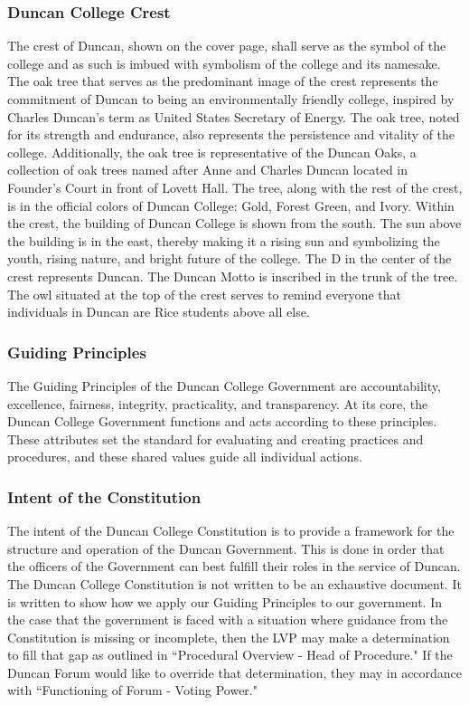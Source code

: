 \documentclass[USletter,12pt]{article}
\begin{document}
\subsubsection{Duncan College Crest}
The crest of Duncan, shown on the cover page, shall serve as the symbol of the college and as such is imbued with symbolism of the college and its namesake.  The oak tree that serves as the predominant image of the crest represents the commitment of Duncan to being an environmentally friendly college, inspired by Charles Duncan's term as United States Secretary of Energy.  The oak tree, noted for its strength and endurance, also represents the persistence and vitality of the college.  Additionally, the oak tree is representative of the Duncan Oaks, a collection of oak trees named after Anne and Charles Duncan located in Founder's Court in front of Lovett Hall.  The tree, along with the rest of the crest, is in the official colors of Duncan College: Gold, Forest Green, and Ivory.  Within the crest, the building of Duncan College is shown from the south.  The sun above the building is in the east, thereby making it a rising sun and symbolizing the youth, rising nature, and bright future of the college.  The D in the center of the crest represents Duncan.  The Duncan Motto is inscribed in the trunk of the tree.  The owl situated at the top of the crest serves to remind everyone that individuals in Duncan are Rice students above all else.

\subsubsection{Guiding Principles}
The Guiding Principles of the Duncan College Government are accountability, excellence, fairness, integrity, practicality, and transparency. At its core, the Duncan College Government functions and acts according to these principles. These attributes set the standard for evaluating and creating practices and procedures, and these shared values guide all individual actions.

\subsubsection{Intent of the Constitution}
The intent of the Duncan College Constitution is to provide a framework for the structure and operation of the Duncan Government.  This is done in order that the officers of the Government can best fulfill their roles in the service of Duncan. 
The Duncan College Constitution is not written to be an exhaustive document.  It is written to show how we apply our Guiding Principles to our government.  In the case that the government is faced with a situation where guidance from the Constitution is missing or incomplete, then the LVP may make a determination to fill that gap as outlined in ``Procedural Overview - Head of Procedure."  If the Duncan Forum would like to override that determination, they may in accordance with ``Functioning of Forum - Voting Power."
\end{document}
